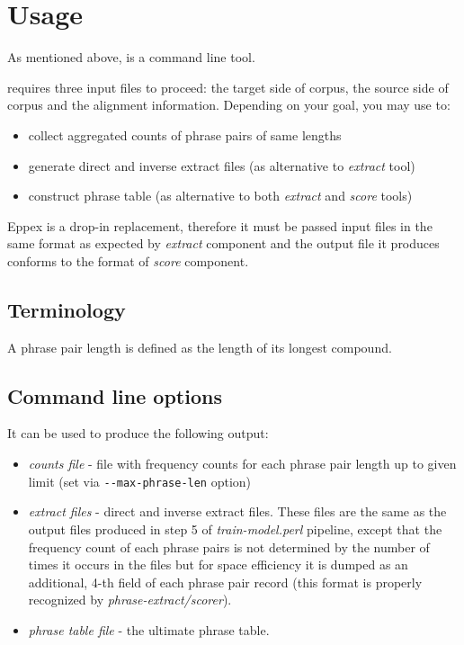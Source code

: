 \chapter{Usage}
\label{chap:usage}

As mentioned above, \eppex{} is a command line tool.

\Eppex{} requires three input files to proceed:
the target side of corpus, the source side of corpus and the alignment information.
Depending on your goal, you may use \eppex{} to:
\begin{itemize}
 \item collect aggregated counts of phrase pairs of same lengths
 \item generate direct and inverse extract files (as alternative to \emph{extract} tool)
 \item construct phrase table (as alternative to both \emph{extract} and \emph{score} tools)
\end{itemize}

Eppex is a drop-in replacement, therefore it must be passed input files
in the same format as expected by \emph{extract} component and
the output file it produces conforms to the format of \emph{score} component.

\section{Terminology}


A phrase pair length is defined as the length of its longest compound.

\section{Command line options}

It can be used to produce the following output:
\begin{itemize}
 \item \emph{counts file} - file with frequency counts for each phrase pair
  length up to given limit (set via \verb|--max-phrase-len| option)
 \item \emph{extract files} - direct and inverse extract files. These files are the
  same as the output files produced in step 5 of \emph{train-model.perl} pipeline,
  except that the frequency count of each phrase pairs is not determined by
  the number of times it occurs in the files but for space efficiency it is
  dumped as an additional, 4-th field of each phrase pair record (this format
  is properly recognized by \emph{phrase-extract/scorer}).
 \item \emph{phrase table file} - the ultimate phrase table.
\end{itemize}

